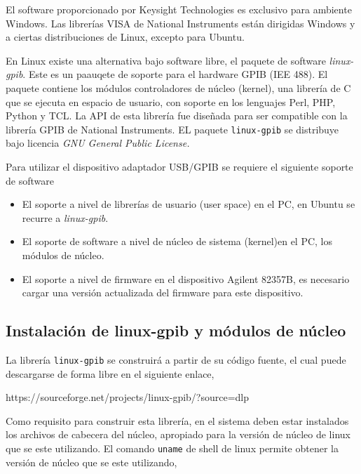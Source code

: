 \documentclass[paper=letter,oneside,fontsize=11pt, parskip=full]{scrartcl}
\newenvironment{link}
	{\ttfamily}{}
\begin{document}
		El software proporcionado por Keysight Technologies es exclusivo para ambiente Windows. Las librerías VISA de National Instruments están dirigidas Windows y a ciertas distribuciones de Linux, excepto para Ubuntu.
		
		En Linux existe una alternativa bajo software libre, el paquete de software \emph{linux-gpib}. Este es un paauqete de soporte para el hardware GPIB (IEE 488).
		El paquete contiene los módulos controladores de núcleo (kernel), una librería de C que se ejecuta en espacio de usuario, con soporte en los lenguajes Perl, PHP, Python y TCL. La API de esta librería fue diseñada para ser compatible con la librería GPIB de National Instruments. EL paquete \texttt{linux-gpib} se distribuye bajo licencia \emph{GNU General Public License.} 
		
		Para utilizar el dispositivo adaptador USB/GPIB se requiere el siguiente soporte de software
		
		\begin{itemize}
			\item El soporte a nivel de librerías de usuario (user space) en el PC, en Ubuntu se recurre a \emph{linux-gpib}.
			\item El soporte de software a nivel de núcleo de sistema (kernel)en el PC, los módulos de núcleo.
			\item El soporte a nivel de firmware en el dispositivo Agilent 82357B, es necesario cargar una versión actualizada del firmware para este dispositivo.
		\end{itemize}
	
		\subsection{Instalación de linux-gpib y módulos de núcleo}
		
		La librería \texttt{linux-gpib} se construirá a partir de su código fuente, el cual puede descargarse de forma libre en el siguiente enlace,
		
		\begin{link}
			https://sourceforge.net/projects/linux-gpib/?source=dlp
		\end{link}
		
		Como requisito para construir esta librería, en el sistema deben estar instalados los archivos de cabecera del núcleo, apropiado para la versión de núcleo de linux que se este utilizando. El comando \texttt{uname} de shell de linux permite obtener la versión de núcleo que se este utilizando, 
		
\end{document}
